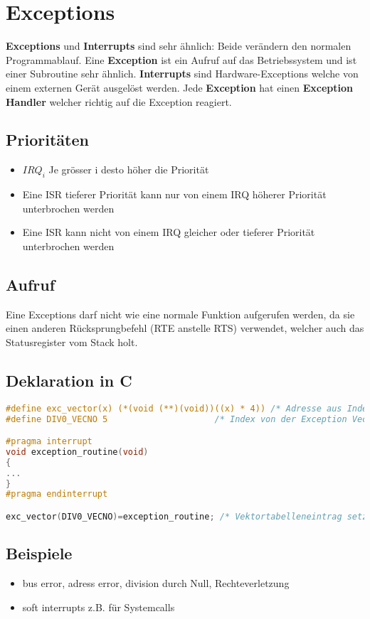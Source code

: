\section{Exceptions}
\textbf{Exceptions} und \textbf{Interrupts} sind sehr ähnlich: Beide verändern den normalen Programmablauf.
Eine \textbf{Exception} ist ein Aufruf auf das Betriebssystem und ist einer Subroutine sehr ähnlich. 
\textbf{Interrupts} sind Hardware-Exceptions welche von einem externen Gerät ausgelöst werden.
Jede \textbf{Exception} hat einen \textbf{Exception Handler} welcher richtig auf die Exception reagiert.
\subsection{Prioritäten}
\begin{itemize}
	\item $IRQ_i$ Je grösser i desto höher die Priorität
	\item Eine ISR tieferer Priorität kann nur von einem IRQ höherer Priorität unterbrochen werden
	\item Eine ISR kann nicht von einem IRQ gleicher oder tieferer Priorität unterbrochen werden
\end{itemize}
\subsection{Aufruf}
Eine Exceptions darf nicht wie eine normale Funktion aufgerufen werden, da sie einen anderen Rücksprungbefehl (RTE anstelle RTS) verwendet, welcher auch das Statusregister vom Stack holt.

\subsection{Deklaration in C}

\begin{lstlisting}[language=C]
#define exc_vector(x) (*(void (**)(void))((x) * 4)) /* Adresse aus Index berechnen */
#define DIV0_VECNO 5                     /* Index von der Exception Vector Assignment */

#pragma interrupt
void exception_routine(void)
{
...
}
#pragma endinterrupt

exc_vector(DIV0_VECNO)=exception_routine; /* Vektortabelleneintrag setzen exc_div0 ist ein funktionsname*/
\end{lstlisting}

\subsection{Beispiele} 
\begin{itemize}
  \item bus error, adress error, division durch Null, Rechteverletzung
  \item soft interrupts z.B. für Systemcalls
\end{itemize}

